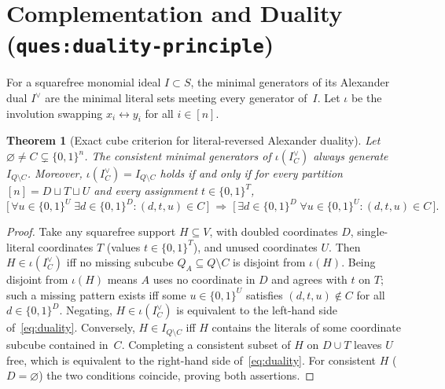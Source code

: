 \documentclass[11pt]{article}
\theoremstyle{plain}
\newtheorem{theorem}{Theorem}
\theoremstyle{definition}
\theoremstyle{remark}
\begin{document}
\section{Complementation and Duality (\texttt{ques:duality-principle})}

For a squarefree monomial ideal $I \subset S$, the minimal generators of its Alexander dual $I^\vee$ are the minimal literal sets meeting every generator of~$I$. Let $\iota$ be the involution swapping $x_i \leftrightarrow y_i$ for all $i \in [n]$.

\begin{theorem}[Exact cube criterion for literal-reversed Alexander duality]\label{thm:duality}
Let $\varnothing \neq C \subsetneq \{0,1\}^n$. The consistent minimal generators of $\iota(I_C^\vee)$ always generate $I_{Q\setminus C}$. Moreover, $\iota(I_C^\vee) = I_{Q\setminus C}$ holds if and only if for every partition $[n] = D \sqcup T \sqcup U$ and every assignment $t \in \{0,1\}^T$,
\begin{equation}\label{eq:duality}
\bigl[\,\forall u \in \{0,1\}^U\;\exists d \in \{0,1\}^D : (d,t,u) \in C\,\bigr]
\;\Longrightarrow\;
\bigl[\,\exists d \in \{0,1\}^D\;\forall u \in \{0,1\}^U : (d,t,u) \in C\,\bigr].
\end{equation}
\end{theorem}

\begin{proof}
Take any squarefree support $H \subseteq V$, with doubled coordinates $D$, single-literal coordinates $T$ (values $t \in \{0,1\}^T$), and unused coordinates $U$. Then $H \in \iota(I_C^\vee)$ iff no missing subcube $Q_A \subseteq Q \setminus C$ is disjoint from $\iota(H)$. Being disjoint from $\iota(H)$ means $A$ uses no coordinate in $D$ and agrees with $t$ on $T$; such a missing pattern exists iff some $u \in \{0,1\}^U$ satisfies $(d,t,u) \notin C$ for all $d \in \{0,1\}^D$. Negating, $H \in \iota(I_C^\vee)$ is equivalent to the left-hand side of~\eqref{eq:duality}. Conversely, $H \in I_{Q\setminus C}$ iff $H$ contains the literals of some coordinate subcube contained in~$C$. Completing a consistent subset of $H$ on $D \cup T$ leaves $U$ free, which is equivalent to the right-hand side of~\eqref{eq:duality}. For consistent $H$ ($D = \varnothing$) the two conditions coincide, proving both assertions.
\end{proof}
\end{document}
